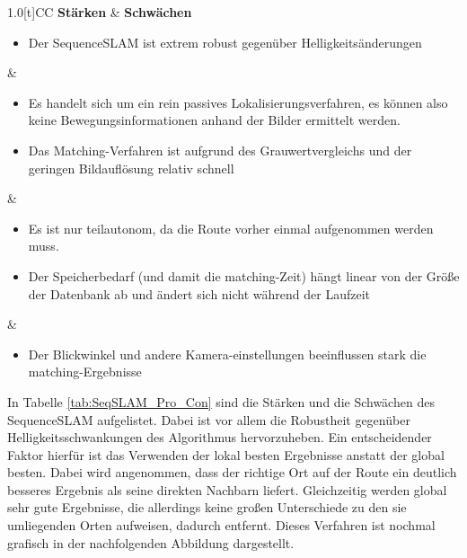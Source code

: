 \documentclass[12pt,a4paper,titlepage]{scrartcl}
\begin{document}
\begin{table}[!htp]
\selectfont
\renewcommand{\tabularxcolumn}[1]{m{#1}} 
\label{tab:SeqSLAM_Pro_Con}
\centering
	\begin{tabularx}{1.0\textwidth}[t]{CC}
	\textbf{Stärken}	&	\textbf{Schwächen}\tabularnewline
	\hline
	\begin{itemize}
	\item Der SequenceSLAM ist extrem robust gegenüber Helligkeitsänderungen\newline \newline
	\end{itemize}
	&
	\begin{itemize}
	\item Es handelt sich um ein rein passives Lokalisierungsverfahren, es können also keine Bewegungsinformationen anhand der Bilder ermittelt werden.
	\end{itemize}
	\tabularnewline
	\hline
	\begin{itemize}
	\item Das Matching-Verfahren ist aufgrund des Grauwertvergleichs und der geringen Bildauflösung relativ schnell
	\end{itemize}	
	&
	\begin{itemize}
	\item Es ist nur teilautonom, da die Route vorher einmal aufgenommen werden muss.\newline
	\end{itemize}	
	\tabularnewline
	\hline
	\begin{itemize}
	\item Der Speicherbedarf (und damit die matching-Zeit) hängt linear von der Größe der Datenbank ab und ändert sich nicht während der Laufzeit
	\end{itemize}
	&
	\begin{itemize}
	\item Der Blickwinkel und andere Kamera-einstellungen beeinflussen stark die matching-Ergebnisse\newline \newline
	\end{itemize}
	\tabularnewline
	\bottomrule
	\end{tabularx}
\end{table}	
In Tabelle \ref{tab:SeqSLAM_Pro_Con} sind die Stärken und die Schwächen des SequenceSLAM aufgelistet. Dabei ist vor allem die Robustheit gegenüber Helligkeitsschwankungen des Algorithmus hervorzuheben. Ein entscheidender Faktor hierfür ist das Verwenden der lokal besten Ergebnisse anstatt der global besten. Dabei wird angenommen, dass der richtige Ort auf der Route ein deutlich besseres Ergebnis als seine direkten Nachbarn liefert. Gleichzeitig werden global sehr gute Ergebnisse, die allerdings keine großen Unterschiede zu den sie umliegenden Orten aufweisen, dadurch entfernt. Dieses Verfahren ist nochmal grafisch in der nachfolgenden Abbildung dargestellt. 
\end{document}
